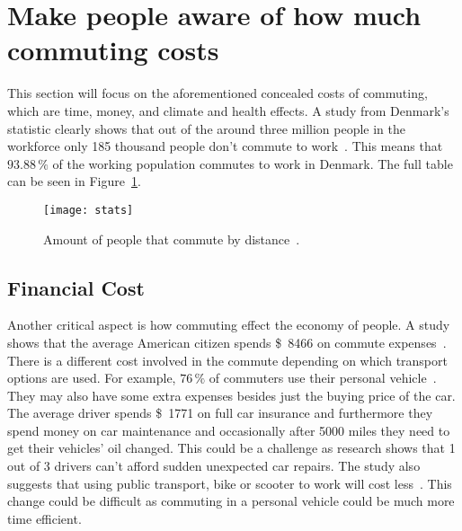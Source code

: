 \section{Make people aware of how much commuting costs}
\label{sec:make-people-aware-of-how-much-money-time-climate-they-are-using-on-commuting}

This section will focus on the aforementioned concealed costs of commuting, which are time, money, and climate and
health effects.
A study from Denmark’s statistic clearly shows that out of the around three million people in the workforce only
185 thousand people don't commute to work~\cite{erhvervspendling2021}.
This means that \(93.88\,\%\) of the working population commutes to work in Denmark.
The full table can be seen in Figure~\ref{fig:dst-commute}.

\begin{figure}
    \centering
    \texttt{[image: stats]}
    \caption{Amount of people that commute by distance~\cite{erhvervspendling2021}.}
    \label{fig:dst-commute}
\end{figure}

\label{subsec:time-cost}


\subsection{Financial Cost}\label{subsec:financial-cost}

Another critical aspect is how commuting effect the economy of people.
A study shows that the average American citizen spends \SI{8466}[\$]{} on commute expenses~\cite{bankrate2023}.
There is a different cost involved in the commute depending on which transport options are used.
For example, \(76\,\%\) of commuters use their personal vehicle~\cite{bankrate2023}.
They may also have some extra expenses besides just the buying price of the car.
The average driver spends \SI{1771}[\$]{} on full car insurance and furthermore they spend money on car maintenance
and occasionally after 5000 miles they need to get their vehicles' oil changed.
This could be a challenge as research shows that 1 out of 3 drivers can't afford sudden unexpected car repairs.
The study also suggests that using public transport, bike or scooter to work will cost less~\cite{bankrate2023}.
This change could be difficult as commuting in a personal vehicle could be much more time efficient.

